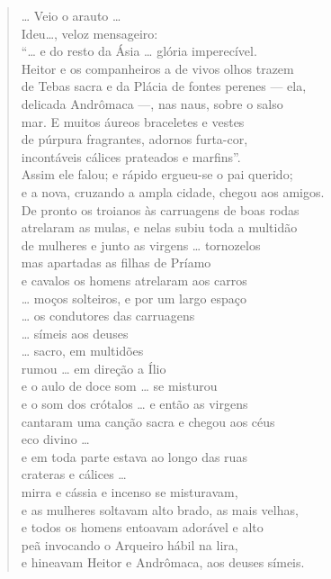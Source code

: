 \begin{verse}
\ldots{} Veio o arauto \ldots{}\\
Ideu\ldots{}, veloz mensageiro:\\
``\ldots{} e do resto da Ásia \ldots{} glória imperecível.\\
Heitor e os companheiros a de vivos olhos trazem\\
de Tebas sacra e da Plácia de fontes perenes --- ela,\\
delicada Andrômaca ---, nas naus, sobre o salso\\
mar. E muitos áureos braceletes e vestes\\
de púrpura fragrantes, adornos furta-cor,\\
incontáveis cálices prateados e marfins''.\\
Assim ele falou; e rápido ergueu-se o pai querido;\\
e a nova, cruzando a ampla cidade, chegou aos \qb{}amigos.\\
De pronto os troianos às carruagens de boas rodas\\
atrelaram as mulas, e nelas subiu toda a multidão \\
de mulheres e junto as virgens \ldots{} tornozelos\\
mas apartadas as filhas de Príamo\\
e cavalos os homens atrelaram aos carros\\
\ldots{} moços solteiros, e por um largo espaço \\
\ldots{} os condutores das carruagens \\
\ldots{} símeis aos deuses\\
\ldots{} sacro, em multidões\\
rumou \ldots{} em direção a Ílio\\
e o aulo de doce som \ldots{} se misturou\\
e o som dos crótalos \ldots{} e então as virgens\\
cantaram uma canção sacra e chegou aos céus\\
eco divino \ldots{}\\
e em toda parte estava ao longo das ruas\\
crateras e cálices \ldots{}\\
mirra e cássia e incenso se misturavam,\\
e as mulheres soltavam alto brado, as mais velhas,\\
e todos os homens entoavam adorável e alto\\
peã invocando o Arqueiro hábil na lira,\\
e hineavam Heitor e Andrômaca, aos deuses símeis.
\end{verse}

